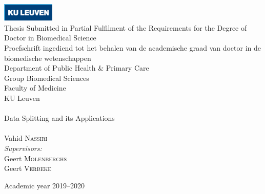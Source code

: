 \begin{titlepage}
\begin{center}

\includegraphics[width=2.5cm]{KULeuvenlogo.eps}\\[0.3cm]
Thesis Submitted in Partial Fulfilment of the Requirements for the
Degree of Doctor in Biomedical Science\\[0.5cm]
{Proefschrift ingediend tot
het behalen van de academische
graad van doctor in de biomedische wetenschappen}
\\[0.6cm]
Department of Public Health \& Primary Care\\
Group Biomedical Sciences\\
Faculty of Medicine\\
KU Leuven \\[0.7cm]

\HRule \\[0.4cm]
{ \huge  Data Splitting and its Applications}\\[0.4cm]

\HRule \\[0.5cm]


{\Large Vahid \textsc{Nassiri}}\\[0.5cm]
\emph{Supervisors:} \\[0.2cm]
{\large Geert \textsc{Molenberghs}}\\
{\large Geert \textsc{Verbeke}}


\vfill

{\large Academic year 2019--2020}

\end{center}
\end{titlepage}
